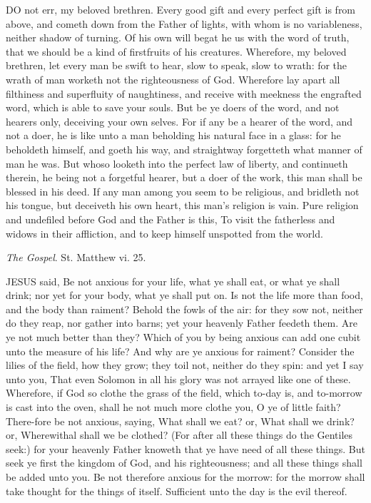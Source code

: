 DO not err, my beloved
brethren. Every good gift and every perfect gift is from above, and cometh
down from the Father of lights, with whom is no variableness, neither
shadow of turning. Of his own will begat he us with the word of truth,
that we should be a kind of firstfruits of his creatures. Wherefore, my
beloved brethren, let every man be swift to hear, slow to speak, slow
to wrath: for the wrath of man worketh not the righteousness of God. Wherefore
lay apart all filthiness and superfluity of naughtiness, and receive with
meekness the engrafted word, which is able to save your souls. But be
ye doers of the word, and not hearers only, deceiving your own selves.
For if any be a hearer of the word, and not a doer, he is like unto a
man beholding his natural face in a glass: for he beholdeth himself, and
goeth his way, and straightway forgetteth what manner of man he was. But
whoso looketh into the perfect law of liberty, and continueth therein,
he being not a forgetful hearer, but a doer of the work, this man shall
be blessed in his deed. If any man among you seem to be religious, and
bridleth not his tongue, but deceiveth his own heart, this man's religion
is vain. Pure religion and undefiled before God and the Father is this,
To visit the fatherless and widows in their affliction, and to keep himself
unspotted from the world.

\emph{The Gospel}. St. Matthew vi. 25.

JESUS
said, Be not anxious for your life, what ye shall eat, or what ye shall
drink; nor yet for your body, what ye shall put on. Is not the life more
than food, and the body than raiment? Behold the fowls of the air: for
they sow not, neither do they reap, nor gather into barns; yet your heavenly
Father feedeth them. Are ye not much better than they? Which of you by
being anxious can add one cubit unto the measure of his life? And why
are ye anxious for raiment? Consider the lilies of the field, how they
grow; they toil not, neither do they spin: and yet I say unto you, That
even Solomon in all his glory was not arrayed like one of these. Wherefore,
if God so clothe the grass of the field, which to-day is, and to-morrow
is cast into the oven, shall he not much more clothe you, O ye of little
faith? There-fore be not anxious, saying, What shall we eat? or, What
shall we drink? or, Wherewithal shall we be clothed? (For after all these
things do the Gentiles seek:) for your heavenly Father knoweth that ye
have need of all these things. But seek ye first the kingdom of God, and
his righteousness; and all these things shall be added unto you. Be not
therefore anxious for the morrow: for the morrow shall take thought for
the things of itself. Sufficient unto the day is the evil thereof.

